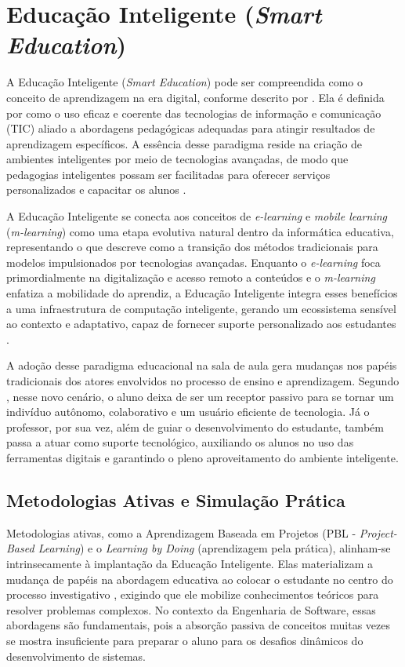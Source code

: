 \section{Educação Inteligente (\textit{Smart Education})}
\label{sec:educacao_inteligente}

A Educação Inteligente (\textit{Smart Education}) pode ser compreendida como o conceito de aprendizagem na era digital, conforme descrito por . Ela é definida por  como o uso eficaz e coerente das tecnologias de informação e comunicação (TIC) aliado a abordagens pedagógicas adequadas para atingir resultados de aprendizagem específicos. A essência desse paradigma reside na criação de ambientes inteligentes por meio de tecnologias avançadas, de modo que pedagogias inteligentes possam ser facilitadas para oferecer serviços personalizados e capacitar os alunos \cite{zhu2016}.

A Educação Inteligente se conecta aos conceitos de \textit{e-learning} e \textit{mobile learning} (\textit{m-learning}) como uma etapa evolutiva natural dentro da informática educativa, representando o que  descreve como a transição dos métodos tradicionais para modelos impulsionados por tecnologias avançadas. Enquanto o \textit{e-learning} foca primordialmente na digitalização e acesso remoto a conteúdos e o \textit{m-learning} enfatiza a mobilidade do aprendiz, a Educação Inteligente integra esses benefícios a uma infraestrutura de computação inteligente, gerando um ecossistema sensível ao contexto e adaptativo, capaz de fornecer suporte personalizado aos estudantes \cite{zhu2016}.

A adoção desse paradigma educacional na sala de aula gera mudanças nos papéis tradicionais dos atores envolvidos no processo de ensino e aprendizagem. Segundo , nesse novo cenário, o aluno deixa de ser um receptor passivo para se tornar um indivíduo autônomo, colaborativo e um usuário eficiente de tecnologia. Já o professor, por sua vez, além de guiar o desenvolvimento do estudante, também passa a atuar como suporte tecnológico, auxiliando os alunos no uso das ferramentas digitais e garantindo o pleno aproveitamento do ambiente inteligente.

\subsection{Metodologias Ativas e Simulação Prática}

Metodologias ativas, como a Aprendizagem Baseada em Projetos (PBL - \textit{Project-Based Learning}) e o \textit{Learning by Doing} (aprendizagem pela prática), alinham-se intrinsecamente à implantação da Educação Inteligente. Elas materializam a mudança de papéis na abordagem educativa ao colocar o estudante no centro do processo investigativo \cite{demir2021}, exigindo que ele mobilize conhecimentos teóricos para resolver problemas complexos. No contexto da Engenharia de Software, essas abordagens são fundamentais, pois a absorção passiva de conceitos muitas vezes se mostra insuficiente para preparar o aluno para os desafios dinâmicos do desenvolvimento de sistemas. 

